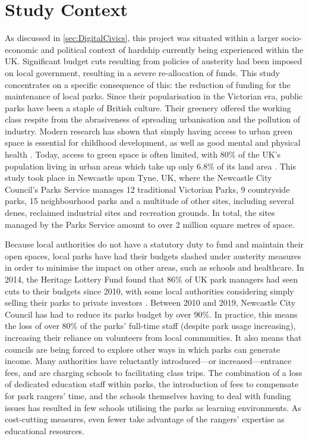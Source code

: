 \section{Study Context}
As discussed in \ref{sec:DigitalCivics}, this project was situated within a larger socio-economic and political context of hardship currently being experienced within the UK. Significant budget cuts resulting from policies of austerity had been imposed on local government, resulting in a severe re-allocation of funds. This study concentrates on a specific consequence of this: the reduction of funding for the maintenance of local parks. Since their popularisation in the Victorian era, public parks have been a staple of British culture. Their greenery offered the working class respite from the abrasiveness of spreading urbanisation and the pollution of industry. Modern research has shown that simply having access to urban green space is essential for childhood development, as well as good mental and physical health \citep{Fiennes2015}. Today, access to green space is often limited, with 80\% of the UK’s population living in urban areas which take up only 6.8\% of its land area \citep{UKNationalEcosystemAssesment2011}. This study took place in Newcastle upon Tyne, UK, where the Newcastle City Council's Parks Service manages 12 traditional Victorian Parks, 9 countryside parks, 15 neighbourhood parks and a multitude of other sites, including several denes, reclaimed industrial sites and recreation grounds. In total, the sites managed by the Parks Service amount to over 2 million square metres of space.

Because local authorities do not have a statutory duty to fund and maintain their open spaces, local parks have had their budgets slashed under austerity measures in order to minimise the impact on other areas, such as schools and healthcare. In 2014, the Heritage Lottery Fund found that 86\% of UK park managers had seen cuts to their budgets since 2010, with some local authorities considering simply selling their parks to private investors \citep{HeritageLotteryFund2014}. Between 2010 and 2019, Newcastle City Council has had to reduce its parks budget by over 90\%. In practice, this means the loss of over 80\% of the parks' full-time staff (despite park usage increasing), increasing their reliance on volunteers from local communities.  It also means that councils are being forced to explore other ways in which parks can generate income. Many authorities have reluctantly introduced---or increased---entrance fees, and are charging schools to facilitating class trips. The combination of a loss of dedicated education staff within parks, the introduction of fees to compensate for park rangers’ time, and the schools themselves having to deal with funding issues has resulted in few schools utilising the parks as learning environments. As cost-cutting measures, even fewer take advantage of the rangers’ expertise as educational resources.

